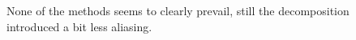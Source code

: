 

\begin{figure}
\caption{None of the methods seems to clearly prevail, still the decomposition introduced a bit less aliasing.}
\label{Homo3}
\end{figure}



